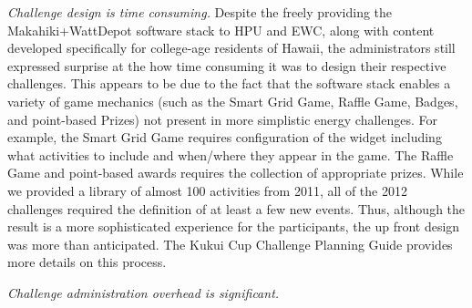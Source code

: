 {\em Challenge design is time consuming.} Despite the freely providing the Makahiki+WattDepot software stack to HPU and EWC, along with content developed specifically for college-age residents of Hawaii, the administrators  still expressed surprise at the how time consuming it was to design their respective challenges.  This appears to be due to the fact that the software stack enables a variety of game mechanics (such as the Smart Grid Game, Raffle Game, Badges, and point-based Prizes) not present in more simplistic energy challenges.  For example, the Smart Grid Game requires configuration of the widget including what activities to include and when/where they appear in the game.  The Raffle Game and point-based awards requires the collection of appropriate prizes. While we provided a library of almost 100 activities from 2011, all of the 2012 challenges required the definition of at least a few new events.  Thus, although the result is a more sophisticated experience for the participants, the up front design was more than anticipated. The Kukui Cup Challenge Planning Guide \cite{KukuiCupChallengePlanningGuide} provides more details on this process.

{\em Challenge administration overhead is significant.}  




